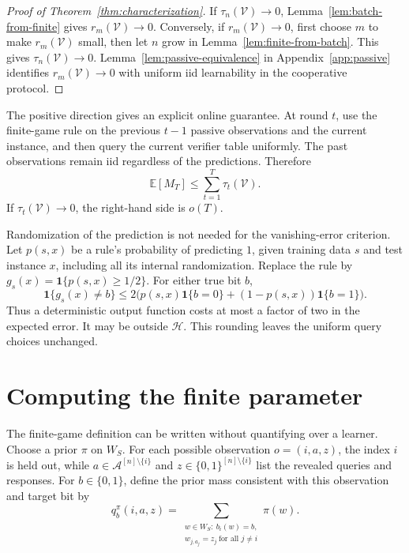 \documentclass[11pt]{article}
\newcommand{\V}{\mathcal V}
\newcommand{\Hclass}{\mathcal H}
\newcommand{\A}{\mathcal A}
\newcommand{\E}{\mathbb E}
\newcommand{\ind}{\mathbf 1}
\begin{document}
\begin{proof}[Proof of Theorem~\ref{thm:characterization}]
If $\tau_n(\V)\to0$, Lemma~\ref{lem:batch-from-finite} gives
$r_m(\V)\to0$. Conversely, if $r_m(\V)\to0$, first choose $m$ to make
$r_m(\V)$ small, then let $n$ grow in Lemma~\ref{lem:finite-from-batch}.
This gives $\tau_n(\V)\to0$. Lemma~\ref{lem:passive-equivalence} in
Appendix~\ref{app:passive} identifies $r_m(\V)\to0$ with uniform iid
learnability in the cooperative protocol.
\end{proof}

The positive direction gives an explicit online guarantee. At round $t$,
use the finite-game rule on the previous $t-1$ passive observations and
the current instance, and then query the current verifier table uniformly.
The past observations remain iid regardless of the predictions. Therefore
\[
\E[M_T]\le\sum_{t=1}^T\tau_t(\V).
\]
If $\tau_t(\V)\to0$, the right-hand side is $o(T)$.

Randomization of the prediction is not needed for the vanishing-error
criterion. Let $p(s,x)$ be a rule's probability of predicting $1$, given
training data $s$ and test instance $x$, including all its internal
randomization. Replace the rule by $g_s(x)=\ind\{p(s,x)\ge1/2\}$. For
either true bit $b$,
\[
\ind\{g_s(x)\ne b\}
\le 2\bigl(p(s,x)\ind\{b=0\}
 +(1-p(s,x))\ind\{b=1\}\bigr).
\]
Thus a deterministic output function costs at most a factor of two in the
expected error. It may be outside $\Hclass$. This rounding leaves the
uniform query choices unchanged.

\section{Computing the finite parameter}\label{sec:parameter}

The finite-game definition can be written without quantifying over a
learner. Choose a prior $\pi$ on $W_S$. For each possible observation
$o=(i,a,z)$, the index $i$ is held out, while
$a\in\A^{[n]\setminus\{i\}}$ and
$z\in\{0,1\}^{[n]\setminus\{i\}}$ list the revealed queries and
responses. For $b\in\{0,1\}$, define the prior mass consistent with this
observation and target bit by
\[
q_b^\pi(i,a,z)=
\sum_{\substack{w\in W_S:\ b_i(w)=b,\\
                   w_{j,a_j}=z_j\ \text{for all }j\ne i}}\pi(w).
\]
\end{document}
